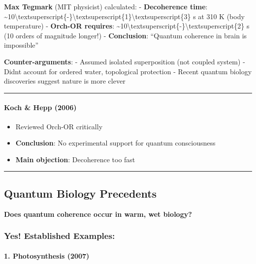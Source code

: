 \textbf{Max Tegmark} (MIT physicist) calculated: - \textbf{Decoherence
time}:
\textasciitilde10\textbackslash textsuperscript\{-\}\textbackslash textsuperscript\{1\}\textbackslash textsuperscript\{3\}
s at 310 K (body temperature) - \textbf{Orch-OR requires}:
\textasciitilde10\textbackslash textsuperscript\{-\}\textbackslash textsuperscript\{2\}
s (10 orders of magnitude longer!) - \textbf{Conclusion}: ``Quantum
coherence in brain is impossible''

\textbf{Counter-arguments}: - Assumed isolated superposition (not
coupled system) - Didn\textquotesingle t account for ordered water,
topological protection - Recent quantum biology discoveries suggest
nature is more clever

\begin{center}\rule{0.5\linewidth}{0.5pt}\end{center}

\paragraph{Koch \& Hepp (2006)}\label{koch-hepp-2006}

\begin{itemize}
\tightlist
\item
  Reviewed Orch-OR critically
\item
  \textbf{Conclusion}: No experimental support for quantum consciousness
\item
  \textbf{Main objection}: Decoherence too fast
\end{itemize}

\begin{center}\rule{0.5\linewidth}{0.5pt}\end{center}

\subsection{Quantum Biology
Precedents}\label{quantum-biology-precedents}

\textbf{Does quantum coherence occur in warm, wet biology?}

\subsubsection{Yes! Established
Examples:}\label{yes-established-examples}

\paragraph{1. Photosynthesis (2007)}\label{photosynthesis-2007}

